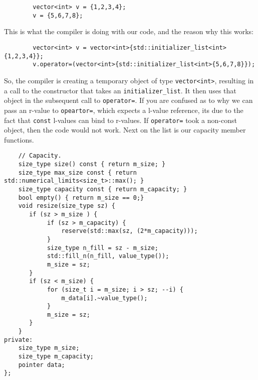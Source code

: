 \documentclass{report}
\begin{document}
     \begin{verbatim}
        vector<int> v = {1,2,3,4};
        v = {5,6,7,8};
     \end{verbatim}
     \bigbreak \noindent
     This is what the compiler is doing with our code, and the reason why this works:
     \begin{verbatim}
        vector<int> v = vector<int>{std::initializer_list<int>{1,2,3,4}};
        v.operator=(vector<int>{std::initializer_list<int>{5,6,7,8}});
     \end{verbatim}
     So, the compiler is creating a temporary object of type \texttt{vector<int>}, resulting in a call to the constructor that takes an \texttt{initializer\_list}. It then uses that object in the subsequent call to \texttt{operator=}. If you are confused as to why we can pass an r-value to \texttt{opeartor=}, which expects a l-value reference, its due to the fact that \texttt{const} l-values can bind to r-values. If \texttt{operator=} took a non-const object, then the code would not work.
     \bigbreak \noindent
     Next on the list is our capacity member functions.

     \begin{verbatim}
    // Capacity.
    size_type size() const { return m_size; }
    size_type max_size const { return std::numerical_limits<size_t>::max(); }
    size_type capacity const { return m_capacity; }
    bool empty() { return m_size == 0;}
    void resize(size_type sz) {
       if (sz > m_size ) {
            if (sz > m_capacity) {
                reserve(std::max(sz, (2*m_capacity)));
            }
            size_type n_fill = sz - m_size;
            std::fill_n(n_fill, value_type());
            m_size = sz;
       }
       if (sz < m_size) {
            for (size_t i = m_size; i > sz; --i) {
                m_data[i].~value_type();
            }
            m_size = sz;
       }
    }
private:
    size_type m_size;
    size_type m_capacity;
    pointer data;
};
\end{verbatim}
\end{document}
